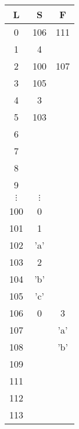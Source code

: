 \documentclass[10pt,landscape]{article}
\begin{document}
\begin{multicols}{3}
\begin{minipage}{0.2\textwidth}
		    	\begin{tabular}{ccc}
		    		L & S & F\\ \hline
		    		0 & 106 & 111\\
		    		1 & 4  & \\
		    		2 & 100 & 107 \\
		    		3 & 105 & \\
		    		4 & 3 & \\
		    		5 & 103 & \\
		    		6 &  & \\
		    		7 &  & \\
		    		8 &  & \\
		    		9 &  & \\
		    		$\vdots$ &$\vdots$  & \\
		    		100 & 0 & \\
		    		101 & 1 & \\
		    		102 & 'a' & \\
		    		103 & 2 & \\
		    		104 & 'b' & \\
		    		105 & 'c' & \\
		    		106 & 0 & 3 \\
		    		107 &  & 'a'\\
		    		108 &  & 'b'\\
		    		109 &  & \\
		    		111 &  & \\
		    		112 &  & \\
		    		113 &  & \\
		    		
		    	
		    \end{tabular}
	
		
		
		
	\end{minipage}
	\end{multicols}
\end{document}

